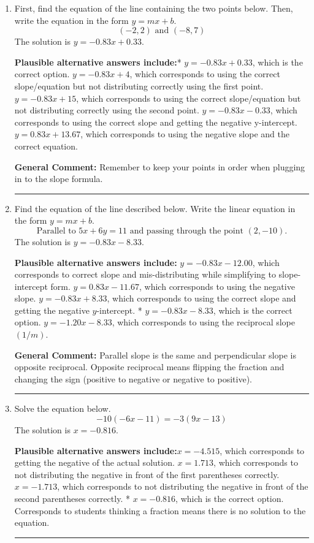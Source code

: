 \documentclass{extbook}[14pt]
\newcommand{\litem}[1]{\item #1

\rule{\textwidth}{0.4pt}}
\begin{document}
\begin{enumerate}\litem{
First, find the equation of the line containing the two points below. Then, write the equation in the form $ y=mx+b $.
\[ (-2, 2) \text{ and } (-8, 7) \]The solution is \( y = -0.83x + 0.33 \).\begin{enumerate}[label=\Alph*.]
\textbf{Plausible alternative answers include:}* $y = -0.83x + 0.33$, which is the correct option.
 $y = -0.83x + 4$, which corresponds to using the correct slope/equation but not distributing correctly using the first point.
 $y = -0.83x + 15$, which corresponds to using the correct slope/equation but not distributing correctly using the second point.
 $y = -0.83x -0.33$, which corresponds to using the correct slope and getting the negative y-intercept.
 $y = 0.83x + 13.67$, which corresponds to using the negative slope and the correct equation.
\end{enumerate}

\textbf{General Comment:} Remember to keep your points in order when plugging in to the slope formula.
}
\litem{
Find the equation of the line described below. Write the linear equation in the form $y=mx+b$.
\[ \text{Parallel to } 5 x + 6 y = 11 \text{ and passing through the point } (2, -10). \]The solution is \( y = -0.83x - 8.33 \).\begin{enumerate}[label=\Alph*.]
\textbf{Plausible alternative answers include:} $y = -0.83x - 12.00$, which corresponds to correct slope and mis-distributing while simplifying to slope-intercept form.
 $y = 0.83x - 11.67$, which corresponds to using the negative slope.
 $y = -0.83x + 8.33$, which corresponds to using the correct slope and getting the negative $y$-intercept.
* $y = -0.83x - 8.33$, which is the correct option.
 $y = -1.20x - 8.33$, which corresponds to using the reciprocal slope $(1/m)$.
\end{enumerate}

\textbf{General Comment:} Parallel slope is the same and perpendicular slope is opposite reciprocal. Opposite reciprocal means flipping the fraction and changing the sign (positive to negative or negative to positive).
}
\litem{
Solve the equation below.
\[ -10(-6x -11) = -3(9x -13) \]The solution is \( x = -0.816 \).\begin{enumerate}[label=\Alph*.]
\textbf{Plausible alternative answers include:}$x = -4.515$, which corresponds to getting the negative of the actual solution.
$x = 1.713$, which corresponds to not distributing the negative in front of the first parentheses correctly.
$x = -1.713$, which corresponds to not distributing the negative in front of the second parentheses correctly.
* $x = -0.816$, which is the correct option.
Corresponds to students thinking a fraction means there is no solution to the equation.
\end{enumerate}

}
\end{enumerate}
\end{document}
